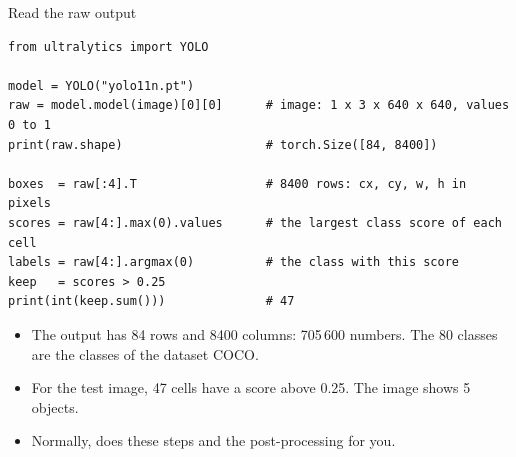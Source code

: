 \begin{frame}[fragile]{Read the raw output}
\begin{lstlisting}[style=python]
from ultralytics import YOLO

model = YOLO("yolo11n.pt")
raw = model.model(image)[0][0]      # image: 1 x 3 x 640 x 640, values 0 to 1
print(raw.shape)                    # torch.Size([84, 8400])

boxes  = raw[:4].T                  # 8400 rows: cx, cy, w, h in pixels
scores = raw[4:].max(0).values      # the largest class score of each cell
labels = raw[4:].argmax(0)          # the class with this score
keep   = scores > 0.25
print(int(keep.sum()))              # 47
\end{lstlisting}
  \small
  \begin{itemize}
    \item The output has 84 rows and 8400 columns: 705\,600 numbers. The
          80 classes are the classes of the dataset COCO.
    \item For the test image, 47 cells have a score above 0.25. The image
          shows 5 objects.
    \item Normally,  does these steps and the
          post-processing for you.
  \end{itemize}
\end{frame}


